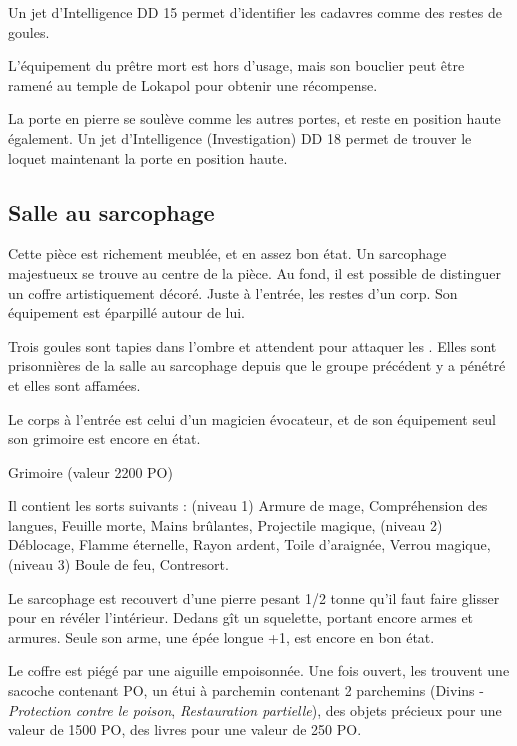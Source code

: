 \documentclass[a4paper,10pt,openany]{book}
\begin{document}
\begin{multicols}{2}
Un jet d’Intelligence DD 15 permet d’identifier les cadavres comme des restes de goules.\par L’équipement du prêtre mort est hors d’usage, mais son
bouclier peut être ramené au temple de Lokapol pour obtenir une récompense.\par La porte en pierre se soulève comme les autres  portes, et reste en
position haute également. Un jet d’Intelligence (Investigation) DD 18 permet de trouver le loquet maintenant la porte en position haute.

\subsection{Salle au sarcophage}
\begin{paperbox}{ }
	Cette pièce est richement meublée, et en assez bon état. Un sarcophage majestueux se trouve au centre de la pièce. Au fond, il est possible de
	distinguer un coffre artistiquement décoré. Juste à l’entrée, les restes d’un corp. Son équipement est éparpillé autour de lui.
\end{paperbox}
Trois goules sont tapies dans l’ombre et attendent pour attaquer les \PJs. Elles sont prisonnières de la salle au sarcophage depuis que le groupe
précédent y a pénétré et elles sont affamées.\par Le corps à l’entrée est celui d’un magicien évocateur, et de son équipement seul son grimoire est
encore en état.
\begin{quotebox}
	Grimoire (valeur 2200 PO)\par\noindent
	Il contient les sorts suivants : (niveau 1) Armure de mage, Compréhension des langues, Feuille morte, Mains brûlantes, Projectile magique, (niveau 2)
	Déblocage, Flamme éternelle, Rayon ardent, Toile d’araignée, Verrou magique, (niveau 3) Boule de feu, Contresort.
\end{quotebox}
Le sarcophage est recouvert d’une pierre pesant 1/2 tonne qu’il faut faire glisser pour en révéler l’intérieur. Dedans gît un squelette,
portant encore armes et armures. Seule son arme, une épée longue +1, est encore en bon état.\par Le coffre est piégé par une aiguille empoisonnée. Une
fois ouvert, les \PJs trouvent une sacoche contenant  PO, un étui à parchemin contenant 2 parchemins (Divins - \emph{Protection contre le
poison}, \emph{Restauration partielle}), des objets précieux pour une valeur de 1500 PO, des livres pour une valeur de 250 PO.


\end{multicols}
\end{document}
